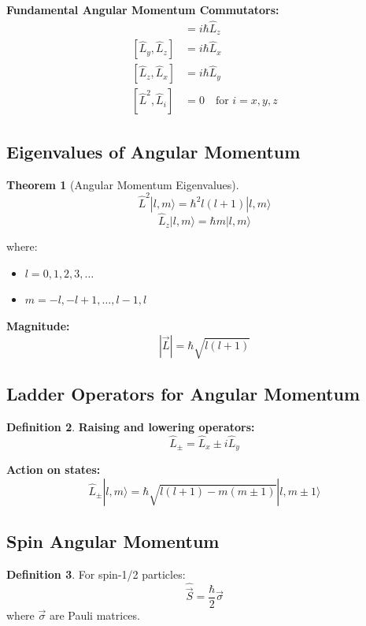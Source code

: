 \documentclass[12pt,a4paper]{article}
\theoremstyle{definition}
\newtheorem{theorem}{Theorem}[section]
\newtheorem{definition}[theorem]{Definition}
\begin{document}
\begin{importantbox}
\textbf{Fundamental Angular Momentum Commutators:}
\begin{align}
[\hat{L}_x, \hat{L}_y] &= i\hbar\hat{L}_z \\
[\hat{L}_y, \hat{L}_z] &= i\hbar\hat{L}_x \\
[\hat{L}_z, \hat{L}_x] &= i\hbar\hat{L}_y \\
[\hat{L}^2, \hat{L}_i] &= 0 \quad \text{for } i = x, y, z
\end{align}
\end{importantbox}

\subsection{Eigenvalues of Angular Momentum}

\begin{theorem}[Angular Momentum Eigenvalues]
\[
\hat{L}^2|l,m\rangle = \hbar^2 l(l+1)|l,m\rangle
\]
\[
\hat{L}_z|l,m\rangle = \hbar m|l,m\rangle
\]

where:
\begin{itemize}
    \item $l = 0, 1, 2, 3, \ldots$
    \item $m = -l, -l+1, \ldots, l-1, l$
\end{itemize}

\textbf{Magnitude:}
\[
|\vec{L}| = \hbar\sqrt{l(l+1)}
\]
\end{theorem}

\subsection{Ladder Operators for Angular Momentum}

\begin{definition}
\textbf{Raising and lowering operators:}
\[
\hat{L}_\pm = \hat{L}_x \pm i\hat{L}_y
\]
\end{definition}

\begin{importantbox}
\textbf{Action on states:}
\[
\hat{L}_\pm|l,m\rangle = \hbar\sqrt{l(l+1) - m(m\pm 1)}|l, m\pm 1\rangle
\]
\end{importantbox}

\subsection{Spin Angular Momentum}

\begin{definition}
For spin-1/2 particles:
\[
\hat{\vec{S}} = \frac{\hbar}{2}\vec{\sigma}
\]
where $\vec{\sigma}$ are Pauli matrices.
\end{definition}
\end{document}
